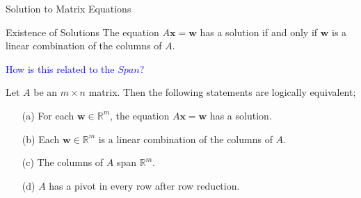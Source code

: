 \documentclass[10pt, aspectratio=169]{beamer}
\begin{document}
\begin{frame}{Solution to Matrix Equations}
    \begin{theorem}{Existence of Solutions}
       The equation \(A\mathbf{x}=\mathbf{w}\) has a solution if and only if \(\mathbf{w}\) is a linear combination of the columns of \(A\).
   \end{theorem}
   \vspace{0.2cm}
   
   \textcolor{blue}{How is this related to the \(Span\)?}
   \begin{lemma}
       Let \(A\) be an \(m\times n\) matrix.
       Then the following statements are logically equivalent;
       \begin{itemize}
         \item[(a)] For each \(\mathbf{w} \in \mathbb{R}^m\), the equation \(A\mathbf{x}=\mathbf{w}\) has a solution.
         \item[(b)] Each \(\mathbf{w} \in \mathbb{R}^m\) is a linear combination of the columns of \(A\).
         \item[(c)] The columns of \(A\) span  \(\mathbb{R}^m\).
         \item[(d)] \(A\) has a pivot in every row after row reduction.
       \end{itemize}
   \end{lemma}    
\end{frame}
\end{document}
